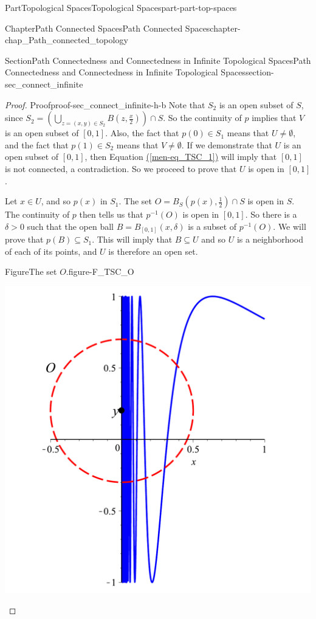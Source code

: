 \documentclass[oneside,10pt,]{book}
\newcommand{\xreffont}{\relax}
\numberwithin{equation}{chapter}
\newcommand{\gt}{>}
\begin{document}
\begin{partptx}{Part}{Topological Spaces}{}{Topological Spaces}{}{}{part-part-top-spaces}
\begin{chapterptx}{Chapter}{Path Connected Spaces}{}{Path Connected Spaces}{}{}{chapter-chap_Path_connected_topology}
\begin{sectionptx}{Section}{Path Connectedness and Connectedness in Infinite Topological Spaces}{}{Path Connectedness and Connectedness in Infinite Topological Spaces}{}{}{section-sec_connect_infinite}
\begin{proof}{Proof}{}{proof-sec_connect_infinite-h-b}
Note that \(S_2\) is an open subset of \(S\), since \(S_2 = \left( \bigcup_{z = (x,y) \in S_2} B\left(z, \frac{x}{2}\right)\right) \cap S\). So the continuity of \(p\) implies that \(V\) is an open subset of \([0,1]\). Also, the fact that \(p(0) \in S_1\) means that \(U \neq \emptyset\), and the fact that \(p(1) \in S_2\) means that \(V \neq \emptyset\). If we demonstrate that \(U\) is an open subset of \([0,1]\), then Equation \hyperref[men-eq_TSC_1]{({\xreffont\ref{men-eq_TSC_1}})} will imply that \([0,1]\) is not connected, a contradiction. So we proceed to prove that \(U\) is open in \([0,1]\).%
\par
Let \(x \in U\), and so \(p(x)\) in \(S_1\). The set \(O = B_S\left(p(x), \frac{1}{2}\right) \cap S\) is open in \(S\). The continuity of \(p\) then tells us that \(p^{-1}(O)\) is open in \([0,1]\). So there is a \(\delta \gt 0\) such that the open ball \(B=B_{[0,1]}(x, \delta)\) is a subset of \(p^{-1}(O)\). We will prove that \(p(B) \subseteq S_1\). This will imply that \(B \subseteq U\) and so \(U\) is a neighborhood of each of its points, and \(U\) is therefore an open set.%
\begin{figureptx}{Figure}{The set \(O\).}{figure-F_TSC_O}{}%
\begin{image}{0.25}{0.5}{0.25}{}%
\includegraphics[width=\linewidth]{external/O_set.pdf}
\end{image}%

\end{figureptx}
\end{proof}
\end{sectionptx}
\end{chapterptx}
\end{partptx}
\end{document}
